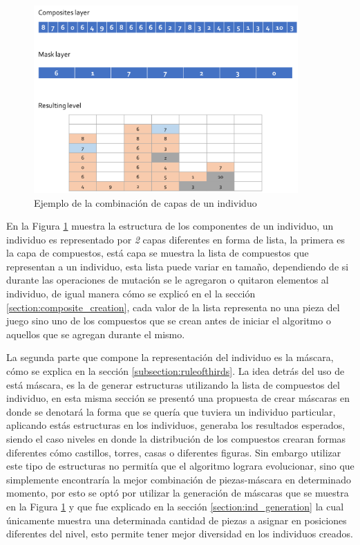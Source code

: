 \begin{figure}
  \centering
  \includegraphics[width=0.9\textwidth]{img/layer12_combine.png}
  \caption{Ejemplo de la combinación de capas de un individuo}
  \label{figure:individual_representation}
\end{figure}

En la Figura \ref{figure:individual_representation} muestra la estructura de los
componentes de un individuo, un individuo es representado por \textit{2} capas
diferentes en forma de lista, la primera es la capa de compuestos, está capa se
muestra la lista de compuestos que representan a un individuo, esta lista puede
variar en tamaño, dependiendo de si durante las operaciones de mutación se le
agregaron o quitaron elementos al individuo, de igual manera cómo se explicó en
el la sección \ref{section:composite_creation}, cada valor de la lista representa
no una pieza del juego sino uno de los compuestos que se crean antes de iniciar
el algoritmo o aquellos que se agregan durante el mismo.

La segunda parte que compone la representación del individuo es la máscara, cómo
se explica en la sección \ref{subsection:ruleofthirds}. La idea detrás del uso de
está máscara, es la de generar estructuras utilizando la lista de compuestos del
individuo, en esta misma sección se presentó una propuesta de crear máscaras en
donde se denotará la forma que se quería que tuviera un individuo particular,
aplicando estás estructuras en los individuos, generaba los resultados esperados,
siendo el caso niveles en donde la distribución de los compuestos crearan formas
diferentes cómo castillos, torres, casas o diferentes figuras. Sin embargo
utilizar este tipo de estructuras no permitía que el algoritmo lograra
evolucionar, sino que simplemente encontraría la mejor combinación de
piezas-máscara en determinado momento, por esto se optó por utilizar la
generación de máscaras que se muestra en la Figura
\ref{figure:individual_representation} y que fue explicado en la sección
\ref{section:ind_generation} la cual únicamente muestra una determinada cantidad
de piezas a asignar en posiciones diferentes del nivel, esto permite tener mejor
diversidad en los individuos creados.

